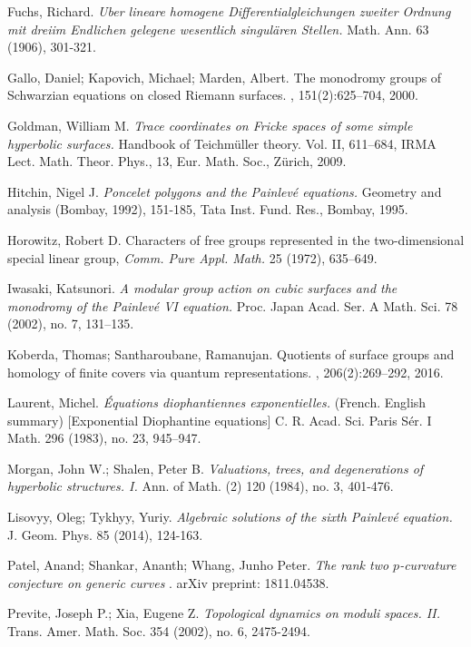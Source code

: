 \documentclass[reqno]{amsart}
\theoremstyle{plain}
\theoremstyle{definition}
\theoremstyle{remark}
\begin{document}
\begin{thebibliography}{99}
 Fuchs, Richard.
 \emph{Uber lineare homogene Differentialgleichungen zweiter Ordnung mit dreiim Endlichen gelegene wesentlich singul\"aren Stellen.}
  Math. Ann. 63 (1906), 301-321.

Gallo, Daniel; Kapovich, Michael; Marden, Albert.
\newblock The monodromy groups of {S}chwarzian equations on closed {R}iemann
surfaces.
, 151(2):625--704, 2000.

Goldman, William M.
\emph{Trace coordinates on Fricke spaces of some simple hyperbolic surfaces.}
Handbook of Teichmüller theory. Vol. II, 611--684, 
IRMA Lect. Math. Theor. Phys., 13, Eur. Math. Soc., Z\"urich, 2009. 

Hitchin, Nigel J.
\emph{Poncelet polygons and the Painlev\'e equations.} Geometry and analysis (Bombay, 1992), 151-185, Tata Inst. Fund. Res., Bombay, 1995.

Horowitz, Robert D.
Characters of free groups represented in the two-dimensional special linear group,
{\em Comm. Pure Appl. Math.} 25 (1972), 635--649.

Iwasaki, Katsunori.
\emph{A modular group action on cubic surfaces and the monodromy of the Painlev\'e VI equation.}
Proc. Japan Acad. Ser. A Math. Sci.
78 (2002), no. 7, 131--135.

Koberda, Thomas; Santharoubane, Ramanujan.
\newblock Quotients of surface groups and homology of finite covers via quantum
representations.
, 206(2):269--292, 2016.

Laurent, Michel.
\emph{\'Equations diophantiennes exponentielles.} (French. English summary) [Exponential Diophantine equations] 
C. R. Acad. Sci. Paris S\'er. I Math. 296 (1983), no. 23, 945--947. 

Morgan, John W.; Shalen, Peter B.
\emph{Valuations, trees, and degenerations of hyperbolic structures. I.} 
Ann. of Math. (2) 120 (1984), no. 3, 401-476.

Lisovyy, Oleg; Tykhyy, Yuriy.
\emph{Algebraic solutions of the sixth Painlev\'e equation.} 
J. Geom. Phys. 85 (2014), 124-163.

Patel, Anand; Shankar, Ananth; Whang, Junho Peter.
\emph{The rank two $p$-curvature conjecture on generic curves }.
arXiv preprint: 1811.04538.

Previte, Joseph P.; Xia, Eugene Z.
\emph{Topological dynamics on moduli spaces. II.}
Trans. Amer. Math. Soc. 354 (2002), no. 6, 2475-2494.


\end{thebibliography}
\end{document}
